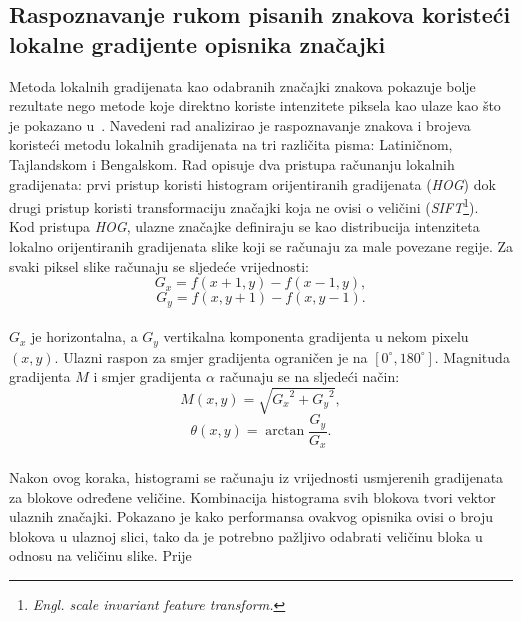 \subsection{Raspoznavanje rukom pisanih znakova koristeći lokalne gradijente opisnika značajki}
\label{subsec:raspoznavanje-rukom-pisanih-znakova-koristeci-lokalne-gradijente-opisnika-znacajki}
Metoda lokalnih gradijenata kao odabranih značajki znakova pokazuje bolje rezultate nego metode koje direktno koriste
intenzitete piksela kao ulaze kao što je pokazano u\ \citep{surinta2015}. Navedeni rad analizirao je raspoznavanje
znakova i brojeva koristeći metodu lokalnih gradijenata na tri različita pisma: Latiničnom, Tajlandskom i Bengalskom.
Rad opisuje dva pristupa računanju lokalnih gradijenata: prvi pristup koristi histogram orijentiranih gradijenata
(\emph{HOG}) dok drugi pristup koristi transformaciju značajki koja ne ovisi o veličini (\emph{SIFT}\footnote{
\emph{Engl. scale invariant feature transform.}}).\\
Kod pristupa \emph{HOG}, ulazne značajke definiraju se kao distribucija intenziteta lokalno orijentiranih gradijenata
slike koji se računaju za male povezane regije. Za svaki piksel slike računaju se sljedeće vrijednosti:\\
\begin{equation*}
    G_x = f(x + 1, y) - f(x - 1, y),
\end{equation*}
\begin{equation*}
    G_y = f(x, y + 1) - f(x, y - 1).
\end{equation*}
\\
$G_x$ je horizontalna, a $G_y$ vertikalna komponenta gradijenta u nekom pixelu $(x, y)$. Ulazni raspon za smjer
gradijenta ograničen je na $[0^{\circ}, 180^{\circ}]$. Magnituda gradijenta $M$ i smjer gradijenta $\alpha$ računaju se
na sljedeći način:\\
\begin{equation*}
    M(x, y) = \sqrt{{G_x}^2 + {G_y}^2},
\end{equation*}
\begin{equation*}
    \theta(x, y) = \arctan{\frac{G_y}{G_x}}.
\end{equation*}
\\
Nakon ovog koraka, histogrami se računaju iz vrijednosti usmjerenih gradijenata za blokove određene veličine.
Kombinacija histograma svih blokova tvori vektor ulaznih značajki. Pokazano je kako performansa ovakvog opisnika ovisi
o broju blokova u ulaznoj slici, tako da je potrebno pažljivo odabrati veličinu bloka u odnosu na veličinu slike. Prije
